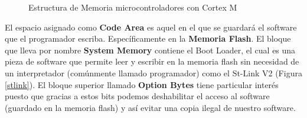 \documentclass[a4paper,12pt]{report} %
\begin{document}
\begin{figure}[H]
	\centering
	\caption{Estructura de Memoria microcontroladores con Cortex M}
	\label{memoria}
\end{figure}

El espacio asignado como \textbf{Code Area} es aquel en el que se guardará el software que el programador escriba. Específicamente en la \textbf{Memoria Flash}. El bloque que lleva por nombre \textbf{System Memory} contiene el Boot Loader, el cual es una pieza de software que permite leer y escribir en la memoria flash sin necesidad de un interpretador (comúnmente llamado programador) como el St-Link V2 (Figura \ref{stlink}). El bloque superior llamado \textbf{Option Bytes} tiene particular interés puesto que gracias a estos bits podemos deshabilitar el acceso al software (guardado en la memoria flash) y así evitar una copia ilegal de nuestro software.
\end{document}

